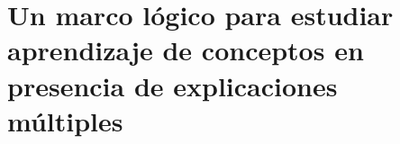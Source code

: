 

\chapter{Un marco lógico para estudiar aprendizaje de conceptos en presencia de explicaciones múltiples}


\begin{abstract}

\end{abstract}
